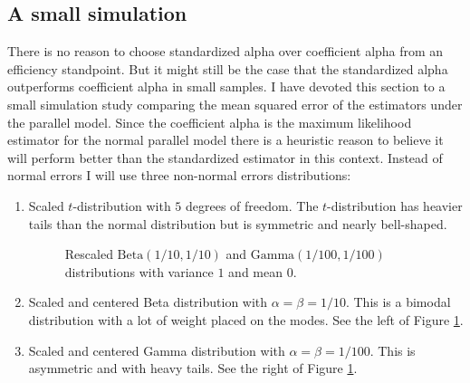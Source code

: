 \documentclass[twoside]{article}
\begin{document}
\subsection{A small simulation}
There is no reason to choose standardized alpha over coefficient alpha from an efficiency standpoint. But it might still be the case
that the standardized alpha outperforms coefficient alpha
in small samples. I have devoted this section to a small simulation
study comparing the mean squared error of the estimators under
the parallel model. Since the coefficient alpha is the maximum likelihood
estimator for the normal parallel model there is a heuristic reason
to believe it will perform better than the standardized estimator
in this context. Instead of normal errors I will use three non-normal
errors distributions:

\begin{enumerate}
\item Scaled $t$-distribution with $5$ degrees of freedom. The $t$-distribution
has heavier tails than the normal distribution but is symmetric and nearly bell-shaped. 
\begin{figure}
	\centering     %
	\caption{Rescaled $\textrm{Beta}(1/10, 1/10)$ and $\textrm{Gamma}(1/100, 1/100)$ distributions with variance $1$ and mean $0$.}
	\label{fig::distributions}
\end{figure}

\item Scaled and centered Beta distribution with $\alpha=\beta=1/10$. This is a bimodal distribution with a lot of weight placed on the modes. See the left of Figure \ref{fig::distributions}.
\item Scaled and centered Gamma distribution with $\alpha=\beta=1/100$. This is asymmetric and with heavy tails. See the right of Figure \ref{fig::distributions}.
\end{enumerate}
\end{document}
